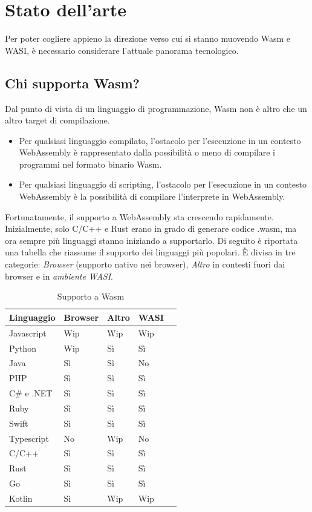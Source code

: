 \section{Stato dell'arte}
Per poter cogliere appieno la direzione verso cui si stanno muovendo Wasm e WASI, è necessario considerare l'attuale
panorama tecnologico. 

\subsection{Chi supporta Wasm?}
Dal punto di vista di un linguaggio di programmazione, Wasm non è altro che un altro target di compilazione.
\begin{itemize}
    \item Per qualsiasi linguaggio compilato, l'ostacolo per l'esecuzione in un contesto WebAssembly è rappresentato
    dalla possibilità o meno di compilare i programmi nel formato binario Wasm.
    \item Per qualsiasi linguaggio di scripting, l'ostacolo per l'esecuzione in un contesto WebAssembly è la possibilità
    di compilare l'interprete in WebAssembly.
\end{itemize}

Fortunatamente, il supporto a WebAssembly sta crescendo rapidamente. Inizialmente, solo C/C++ e Rust erano in grado di
generare codice .wasm, ma ora sempre più linguaggi stanno iniziando a supportarlo. Di seguito è riportata una tabella
che riassume il supporto dei linguaggi più popolari\cite{most-popular-technologies-stack-overflow}. È divisa in tre
categorie: \textit{Browser} (supporto nativo nei browser), \textit{Altro} in contesti fuori dai browser e in
\textit{ambiente WASI}.
\begin{table}[H]
    \centering
    \begin{tabular}{|l|l|l|l|l|}
    \hline
        \textbf{Linguaggio} & \textbf{Browser} & \textbf{Altro} & \textbf{WASI} \\ \hline
        Javascript & Wip & Wip & Wip  \\ \hline
        Python & Wip & Sì & Sì  \\ \hline
        Java & Sì & Sì & No  \\ \hline
        PHP & Sì & Sì & Sì  \\ \hline
        C\# e .NET & Sì & Sì & Sì  \\ \hline
        Ruby & Sì & Sì & Sì  \\ \hline
        Swift & Sì & Sì & Sì  \\ \hline
        Typescript & No & Wip & No  \\ \hline
        C/C++ & Sì & Sì & Sì  \\ \hline
        Rust & Sì & Sì & Sì  \\ \hline
        Go & Sì & Sì & Sì  \\ \hline
        Kotlin & Sì & Wip & Wip  \\ \hline
    \end{tabular}
    \caption{Supporto a Wasm}
\end{table}

